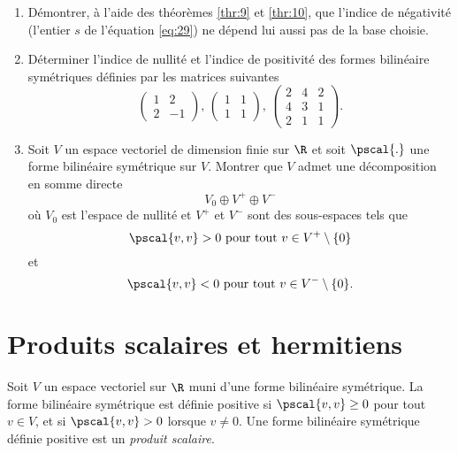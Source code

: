 \begin{enumerate}
\item Démontrer, à l'aide des théorèmes \ref{thr:9} et \ref{thr:10}, que l'indice de négativité (l'entier $s$ de l'équation \eqref{eq:29}) ne dépend lui aussi pas de la base choisie.
\item Déterminer l'indice de nullité et l'indice de positivité des 
formes bilinéaire symétriques 
 définies par les matrices suivantes
  \begin{displaymath}
    \begin{pmatrix}
      1 & 2 \\
      2 & -1
    \end{pmatrix}
    , \,
    \begin{pmatrix}
      1 & 1 \\
      1 & 1
    \end{pmatrix}, \, 
    \begin{pmatrix}
      2 & 4 & 2 \\
      4 & 3 &  1 \\ 
      2 & 1 &1
    \end{pmatrix}. 
  \end{displaymath}

\item Soit $V$ un espace vectoriel de dimension finie sur $\R$ et soit $\pscal{.}$ une forme bilinéaire symétrique  sur $V$.  Montrer que $V$ admet une décomposition en somme directe 
  \begin{displaymath}
    V_0 \oplus V^+ \oplus V^-
  \end{displaymath}
où $V_0$ est l'espace de nullité et $V^+$ et $V^-$ sont des sous-espaces tels que 
\begin{displaymath}
  \pscal{v,v} >0 \text{ pour tout } v \in V^+ \setminus\{0\}
\end{displaymath}
et  
\begin{displaymath}
  \pscal{v,v} <0 \text{ pour tout } v \in V^- \setminus\{0\}. 
\end{displaymath}
\end{enumerate}






\chapter{Produits scalaires et hermitiens}
\label{sec:le-case-reel}




\begin{definition}
  \label{def:4}
  Soit $V$ un espace vectoriel sur $\R$ muni 
  d'une forme bilinéaire symétrique. 
  La forme bilinéaire symétrique  est définie positive si $\pscal{v,v} \geq 0$ pour tout $v \in V$, et si $\pscal{v,v}>0$ lorsque $v \neq 0$. Une forme bilinéaire symétrique définie positive est un \emph{produit scalaire}. 
\end{definition}

